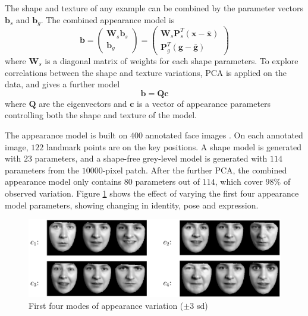 The shape and texture of any example can be combined by the parameter vectors $\mathbf{b}_s$ and $\mathbf{b}_g$. The combined appearance model is
\begin{equation}
 \mathbf{b} = \left ( 
		\begin{array}{c}
		 \mathbf{W}_s \mathbf{b}_s \\
		 \mathbf{b}_g
		\end{array}
                   \right ) =
\left ( 
	\begin{array}{c}
	  \mathbf{W}_s \mathbf{P}_s^T(\mathbf{x}-\bar{\mathbf{x}}) \\
	  \mathbf{P}_g^T(\mathbf{g}-\bar{\mathbf{g}}) 
	\end{array}
\right )
\end{equation}
where $\mathbf{W}_s$ is a diagonal matrix of weights for each shape parameters. To explore correlations between the shape and texture variations, PCA is applied on the data, and gives a further model
\begin{equation}
 \mathbf{b} =  \mathbf{Q}  \mathbf{c}
\end{equation}
where $ \mathbf{Q}$ are the eigenvectors and $\mathbf{c}$ is a vector of appearance parameters controlling both the shape and texture of the model.

The appearance model is built on $400$ annotated face images \cite{Cootes1996}. On each annotated image, $122$ landmark points are on the key positions. A shape model is generated with $23$ parameters, and a shape-free grey-level model is generated with $114$ parameters from the $10000$-pixel patch. After the further PCA, the combined appearance model only contains $80$ parameters out of $114$, which cover $98\%$ of observed variation. \mbox{Figure} \ref{fig:AAMvariation} shows the effect of varying the first four appearance model parameters, showing changing in identity, pose and expression.
\begin{figure}[t]
 \begin{center}
  \includegraphics[width=\columnwidth]{ch2/figures/firstfourAAM.jpg}
  \caption{First four modes of appearance variation ($\pm 3$ sd) \cite{Cootes2001}}
  \label{fig:AAMvariation}
 \end{center}
\end{figure} 

